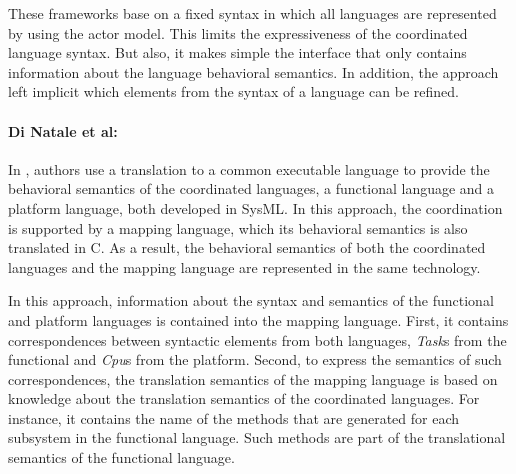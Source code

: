 These frameworks base on a fixed syntax in which all languages are represented by using the actor model. This limits the expressiveness of the coordinated language syntax. But also, it makes simple the interface that only contains information about the language behavioral semantics. In addition, the approach left implicit which elements from the syntax of a language can be refined.   

     

 	


\paragraph{Di Natale et al: }
In \cite{dinatale}, authors use a translation to a common executable language to provide the behavioral semantics of the coordinated languages, \ie a functional language and a platform language, both developed in SysML. In this approach, the coordination is supported by a mapping language, which its behavioral semantics is also translated in C. As a result, the behavioral semantics of both the coordinated languages and the mapping language are represented in the same technology.

In this approach, information about the syntax and semantics of the functional and platform languages is contained into the mapping language. First, it contains correspondences between syntactic elements from both languages, \eg \emph{Task}s from the functional and \emph{Cpu}s from the platform. Second, to express the semantics of such correspondences, the translation semantics of the mapping language is based on knowledge about the translation semantics of the coordinated languages. For instance, it contains the name of the methods that are generated for each subsystem in the functional language. Such methods are part of the translational semantics of the functional language. 

